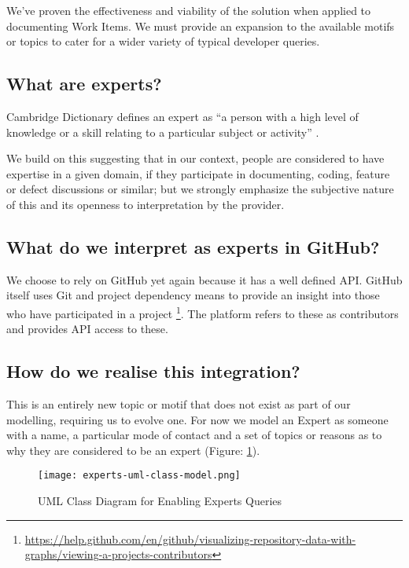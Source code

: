 We've proven the effectiveness and viability of the solution when applied to documenting Work Items. We must provide an expansion to the available motifs or topics to cater for a wider variety of typical developer queries.



\subsection{What are experts?}

Cambridge Dictionary defines an expert as ``a person with a high level of knowledge or a skill relating to a particular subject or activity'' .

We build on this suggesting that in our context, people are considered to have expertise in a given domain, if they participate in documenting, coding, feature or defect discussions or similar; but we strongly emphasize the subjective nature of this and its openness to interpretation by the provider.

\subsection{What do we interpret as experts in GitHub?}

We choose to rely on GitHub yet again because it has a well defined API. GitHub itself uses Git and project dependency means to provide an insight into those who have participated in a project \footnote{\url{https://help.github.com/en/github/visualizing-repository-data-with-graphs/viewing-a-projects-contributors}}. The platform refers to these as contributors and provides API access to these.

\subsection{How do we realise this integration?}

This is an entirely new topic or motif that does not exist as part of our modelling, requiring us to evolve one. For now we model an Expert as someone with a name, a particular mode of contact and a set of topics or reasons as to why they are considered to be an expert (Figure: \ref{fig:expertsUmlClassModel}).

\begin{figure}[h!]
	\centering
	\texttt{[image: experts-uml-class-model.png]}
	\caption{UML Class Diagram for Enabling Experts Queries}
	\label{fig:expertsUmlClassModel}
\end{figure}


